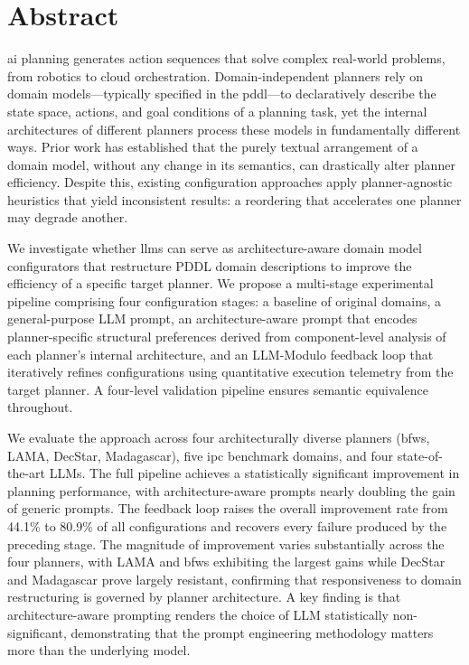 \documentclass[
  numbers=noenddot,
  english,  %
  a4paper,  %
  oneside,  %
  bibliography=totoc,
  headsepline,
  cleardoublepage=empty,
  parskip=half,
  draft=false
]{scrbook}
\theoremstyle{break}
\begin{document}
\raggedbottom
{}
\Titelblatt

\pagestyle{plain.scrheadings}
\renewcommand*{\chapterpagestyle}{plain.scrheadings}

\section*{Abstract}

\gls{ai} planning generates action sequences that solve complex real-world problems, from robotics to cloud orchestration. Domain-independent planners rely on domain models---typically specified in the \gls{pddl}---to declaratively describe the state space, actions, and goal conditions of a planning task, yet the internal architectures of different planners process these models in fundamentally different ways. Prior work has established that the purely textual arrangement of a domain model, without any change in its semantics, can drastically alter planner efficiency. Despite this, existing configuration approaches apply planner-agnostic heuristics that yield inconsistent results: a reordering that accelerates one planner may degrade another.

We investigate whether \glspl{llm} can serve as architecture-aware domain model configurators that restructure PDDL domain descriptions to improve the efficiency of a specific target planner. We propose a multi-stage experimental pipeline comprising four configuration stages: a baseline of original domains, a general-purpose LLM prompt, an architecture-aware prompt that encodes planner-specific structural preferences derived from component-level analysis of each planner's internal architecture, and an LLM-Modulo feedback loop that iteratively refines configurations using quantitative execution telemetry from the target planner. A four-level validation pipeline ensures semantic equivalence throughout.

We evaluate the approach across four architecturally diverse planners (\gls{bfws}, LAMA, DecStar, Madagascar), five \gls{ipc} benchmark domains, and four state-of-the-art LLMs. The full pipeline achieves a statistically significant improvement in planning performance, with architecture-aware prompts nearly doubling the gain of generic prompts. The feedback loop raises the overall improvement rate from 44.1\% to 80.9\% of all configurations and recovers every failure produced by the preceding stage. The magnitude of improvement varies substantially across the four planners, with LAMA and \gls{bfws} exhibiting the largest gains while DecStar and Madagascar prove largely resistant, confirming that responsiveness to domain restructuring is governed by planner architecture. A key finding is that architecture-aware prompting renders the choice of LLM statistically non-significant, demonstrating that the prompt engineering methodology matters more than the underlying model.
\end{document}
